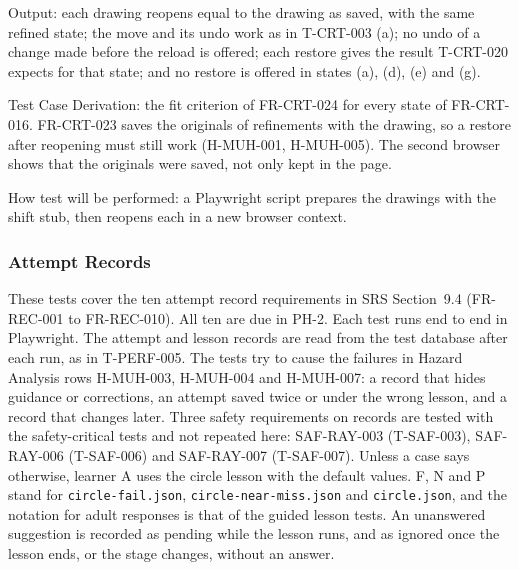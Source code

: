\documentclass[12pt, titlepage]{article}
\begin{document}
\begin{enumerate}
Output: each drawing reopens equal to the drawing as saved, with the same
refined state; the move and its undo work as in T-CRT-003 (a); no undo of a
change made before the reload is offered; each restore gives the result
T-CRT-020 expects for that state; and no restore is offered in states (a),
(d), (e) and (g).

Test Case Derivation: the fit criterion of FR-CRT-024 for every state of
FR-CRT-016. FR-CRT-023 saves the originals of refinements with the drawing,
so a restore after reopening must still work (H-MUH-001, H-MUH-005). The
second browser shows that the originals were saved, not only kept in the
page.

How test will be performed: a Playwright script prepares the drawings with
the shift stub, then reopens each in a new browser context.

\end{enumerate}

\subsubsection{Attempt Records}
\label{sec:rec-tests}

These tests cover the ten attempt record requirements in SRS Section~9.4
(FR-REC-001 to FR-REC-010). All ten are due in PH-2. Each test runs end to end in Playwright. The attempt and
lesson records are read from the test database after each run, as in
T-PERF-005. The tests try to cause the failures in Hazard Analysis rows
H-MUH-003, H-MUH-004 and H-MUH-007: a record that hides guidance or
corrections, an attempt saved twice or under the wrong lesson, and a record
that changes later. Three safety requirements on records are tested with
the safety-critical tests and not repeated here: SAF-RAY-003 (T-SAF-003),
SAF-RAY-006 (T-SAF-006) and SAF-RAY-007 (T-SAF-007). Unless a case says
otherwise, learner A uses the circle lesson with the default values. F, N
and P stand for \texttt{circle-\allowbreak{}fail.json},
\texttt{circle-\allowbreak{}near-\allowbreak{}miss.json} and
\texttt{circle.json}, and the notation for adult responses is that of the
guided lesson tests. An unanswered suggestion is recorded as pending while
the lesson runs, and as ignored once the lesson ends, or the stage changes,
without an answer.
\end{document}
